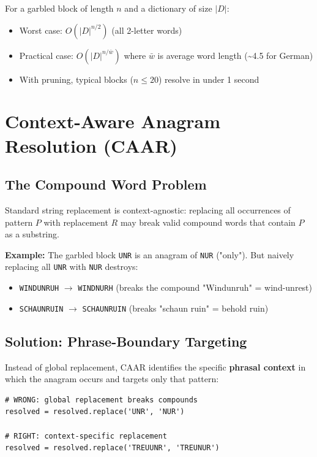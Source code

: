 \documentclass[11pt,a4paper]{article}
\begin{document}
For a garbled block of length $n$ and a dictionary of size $|D|$:

\begin{itemize}
\item Worst case: $O(|D|^{n/2})$ (all 2-letter words)
\item Practical case: $O(|D|^{n/\bar{w}})$ where $\bar{w}$ is average word length (\textasciitilde4.5 for German)
\item With pruning, typical blocks ($n \leq 20$) resolve in under 1 second
\end{itemize}

\section{Context-Aware Anagram Resolution (CAAR)}

\subsection{The Compound Word Problem}

Standard string replacement is context-agnostic: replacing all occurrences of pattern $P$ with replacement $R$ may break valid compound words that contain $P$ as a substring.

\textbf{Example:} The garbled block \texttt{UNR} is an anagram of \texttt{NUR} ("only"). But naively replacing all \texttt{UNR} with \texttt{NUR} destroys:
\begin{itemize}
\item \texttt{WINDUNRUH} $\rightarrow$ \texttt{WINDNURH} (breaks the compound "Windunruh" = wind-unrest)
\item \texttt{SCHAUNRUIN} $\rightarrow$ \texttt{SCHAUNRUIN} (breaks "schaun ruin" = behold ruin)
\end{itemize}

\subsection{Solution: Phrase-Boundary Targeting}

Instead of global replacement, CAAR identifies the specific \textbf{phrasal context} in which the anagram occurs and targets only that pattern:

\begin{lstlisting}[style=python]
# WRONG: global replacement breaks compounds
resolved = resolved.replace('UNR', 'NUR')

# RIGHT: context-specific replacement
resolved = resolved.replace('TREUUNR', 'TREUNUR')
\end{lstlisting}
\end{document}

